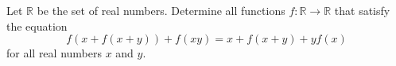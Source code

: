 Let 
$\mathbb R$
 be the set of real numbers. Determine all functions 
$f:\mathbb R\to\mathbb R$
 that satisfy the equation
\[f(x+f(x+y))+f(xy)=x+f(x+y)+yf(x)\]
for all real numbers 
$x$
 and 
$y$.
